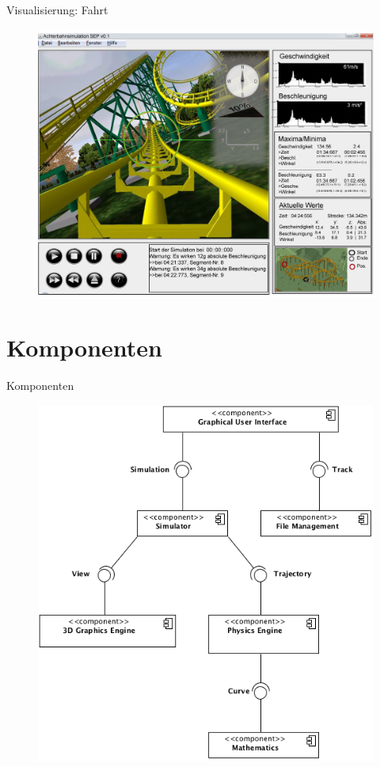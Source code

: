 \documentclass[
	ngerman,
	xcolor=dvipsnames,
	11pt
	]{beamer}
\begin{document}
		\begin{frame}{Visualisierung: Fahrt}
		\begin{figure}
			\includegraphics[width=0.78\linewidth]{GUI_v2.jpg}
		\end{figure}
	\end{frame}
	
	\section{Komponenten}
	\begin{frame}{Komponenten}
		\begin{figure}
			\includegraphics[width=0.55\linewidth]{component_overview.png}
		\end{figure}
	\end{frame}
	
	
\end{document}

